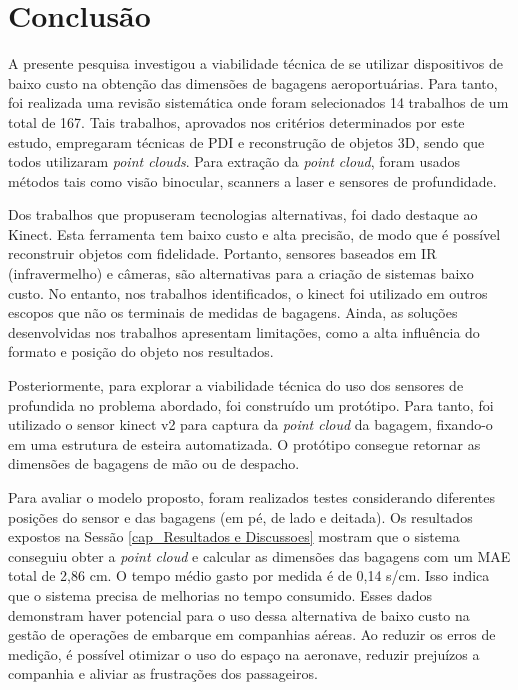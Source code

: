 %
\chapter[Conclusão]{Conclusão}
\label{cap_conclusao}

    A presente pesquisa investigou a viabilidade técnica de se utilizar dispositivos de baixo custo na obtenção das dimensões de bagagens aeroportuárias. Para tanto, foi realizada uma revisão sistemática onde foram selecionados 14 trabalhos de um total de 167. Tais trabalhos, aprovados nos critérios determinados por este estudo, empregaram técnicas de PDI e reconstrução de objetos 3D, sendo que todos utilizaram \textit{point clouds}. Para extração da \textit{point cloud}, foram usados métodos tais como visão binocular, scanners a laser e sensores de profundidade. 
    
    Dos trabalhos que propuseram tecnologias alternativas, foi dado destaque ao Kinect. Esta ferramenta tem baixo custo e alta precisão, de modo que é possível reconstruir objetos com fidelidade. Portanto, sensores baseados em IR (infravermelho) e câmeras, são alternativas para a criação de sistemas baixo custo. No entanto, nos trabalhos identificados, o kinect foi utilizado em outros escopos que não os terminais de medidas de bagagens. Ainda, as soluções desenvolvidas nos trabalhos apresentam limitações, como a alta influência do formato e posição do objeto nos resultados.
    
    Posteriormente, para explorar a viabilidade técnica do uso dos sensores de profundida no problema abordado, foi construído um protótipo. Para tanto, foi utilizado o sensor kinect v2 para captura da \textit{point cloud} da bagagem, fixando-o em uma estrutura de esteira automatizada. O protótipo consegue retornar as dimensões de bagagens de mão ou de despacho. 
    
    Para avaliar o modelo proposto, foram realizados testes considerando diferentes posições do sensor e das bagagens (em pé, de lado e deitada). Os resultados expostos na Sessão \ref{cap_Resultados e Discussoes} mostram que o sistema conseguiu obter a \textit{point cloud} e calcular as dimensões das bagagens com um MAE total de 2,86 cm. O tempo médio gasto por medida é de 0,14 s/cm. Isso indica que o sistema precisa de melhorias no tempo consumido. Esses dados demonstram haver potencial para o uso dessa alternativa de baixo custo na gestão de operações de embarque em companhias aéreas. Ao reduzir os erros de medição, é possível otimizar o uso do espaço na aeronave, reduzir prejuízos a companhia e aliviar as frustrações dos passageiros.

